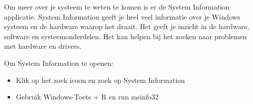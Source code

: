 Om meer over je systeem te weten te komen is er de System Information applicatie. System Information geeft je heel veel informatie over je Windows systeem en de hardware waarop het draait. Het geeft je inzicht in de hardware, software en systeemonderdelen. Het kan helpen bij het zoeken naar problemen met hardware en drivers.

Om System Information te openen:
\begin{itemize}
\item Klik op het zoek icoon en zoek op System Information
\item Gebruik Windows-Toets + R en run msinfo32
\end{itemize}

\begin{minipage}[t]{\linewidth}
\raggedright
{}
\end{minipage}

